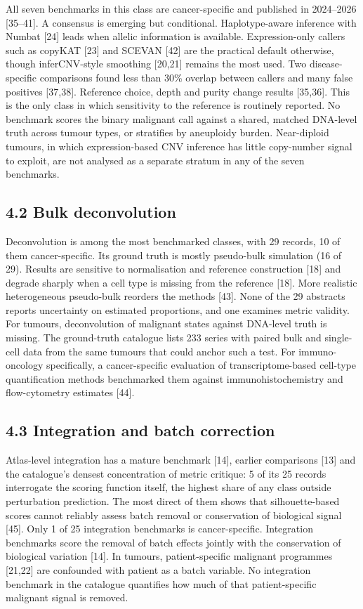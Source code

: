 \documentclass[11pt]{article}
\begin{document}
All seven benchmarks in this class are cancer-specific and published in
2024--2026 {[}35--41{]}. A consensus is emerging but conditional.
Haplotype-aware inference with Numbat {[}24{]} leads when allelic
information is available. Expression-only callers such as copyKAT
{[}23{]} and SCEVAN {[}42{]} are the practical default otherwise, though
inferCNV-style smoothing {[}20,21{]} remains the most used. Two
disease-specific comparisons found less than 30\% overlap between
callers and many false positives {[}37,38{]}. Reference choice, depth
and purity change results {[}35,36{]}. This is the only class in which
sensitivity to the reference is routinely reported. No benchmark scores
the binary malignant call against a shared, matched DNA-level truth
across tumour types, or stratifies by aneuploidy burden. Near-diploid
tumours, in which expression-based CNV inference has little copy-number
signal to exploit, are not analysed as a separate stratum in any of the
seven benchmarks.

\subsection{4.2 Bulk deconvolution}\label{bulk-deconvolution}

Deconvolution is among the most benchmarked classes, with 29 records, 10
of them cancer-specific. Its ground truth is mostly pseudo-bulk
simulation (16 of 29). Results are sensitive to normalisation and
reference construction {[}18{]} and degrade sharply when a cell type is
missing from the reference {[}18{]}. More realistic heterogeneous
pseudo-bulk reorders the methods {[}43{]}. None of the 29 abstracts
reports uncertainty on estimated proportions, and one examines metric
validity. For tumours, deconvolution of malignant states against
DNA-level truth is missing. The ground-truth catalogue lists 233 series
with paired bulk and single-cell data from the same tumours that could
anchor such a test. For immuno-oncology specifically, a cancer-specific
evaluation of transcriptome-based cell-type quantification methods
benchmarked them against immunohistochemistry and flow-cytometry
estimates {[}44{]}.

\subsection{4.3 Integration and batch correction}\label{integration-and-batch-correction}

Atlas-level integration has a mature benchmark {[}14{]}, earlier
comparisons {[}13{]} and the catalogue's densest concentration of metric
critique: 5 of its 25 records interrogate the scoring function itself,
the highest share of any class outside perturbation prediction. The most
direct of them shows that silhouette-based scores cannot reliably assess
batch removal or conservation of biological signal {[}45{]}. Only 1 of
25 integration benchmarks is cancer-specific. Integration benchmarks
score the removal of batch effects jointly with the conservation of
biological variation {[}14{]}. In tumours, patient-specific malignant
programmes {[}21,22{]} are confounded with patient as a batch variable.
No integration benchmark in the catalogue quantifies how much of that
patient-specific malignant signal is removed.
\end{document}
